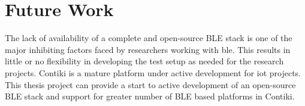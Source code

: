 \section{Future Work}

The lack of availability of a complete and open-source BLE stack is one of the major inhibiting factors faced by researchers working with \gls{ble}. This results in little or no flexibility in developing the test setup as needed for the research projects. Contiki is a mature platform under active development for \gls{iot} projects. This thesis project can provide a start to active development of an open-source BLE stack and support for greater number of BLE based platforms in Contiki.